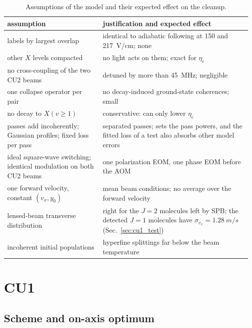\documentclass[11pt,a4paper,oneside]{report}
\newcommand{\etac}{\eta_{\mathrm{c}}}
\begin{document}
\begin{table}[htbp]
  \centering
  \caption[Assumptions of the model]{Assumptions of the model and their expected effect on the cleanup.}
  \label{tab:assumptions}
  \small
  \begin{tabularx}{\textwidth}{>{\raggedright\arraybackslash}p{}L}
    \toprule
    assumption & justification and expected effect \\
    \midrule
    labels by largest overlap & identical to adiabatic following at 150 and \SI{217}{V/cm}; none \\
    other $X$ levels compacted & no light acts on them; exact for $\etac$ \\
    no cross-coupling of the two CU2 beams & detuned by more than \SI{45}{MHz}; negligible \\
    one collapse operator per pair & no decay-induced ground-state coherences; small \\
    no decay to $X(v\geq1)$ & conservative: can only lower $\etac$ \\
    passes add incoherently; Gaussian profiles; fixed loss per pass & separated passes; sets the pass
      powers, and the fitted loss of a test also absorbs other model errors \\
    ideal square-wave switching; identical modulation on both CU2 beams & one polarization EOM, one
      phase EOM before the AOM \\
    one forward velocity, constant $(v_x,y_0)$ & mean beam conditions; no average over the forward
      velocity \\
    lensed-beam transverse distribution & right for the $J=2$ molecules left by SPB; the detected $J=1$
      molecules have $\sigma_{v_x}=\SI{1.28}{m/s}$ (Sec.~\ref{sec:cu1_test}) \\
    incoherent initial populations & hyperfine splittings far below the beam temperature \\
    \bottomrule
  \end{tabularx}
\end{table}

\section{CU1}
\label{sec:cu1}

\subsection{Scheme and on-axis optimum}
\end{document}
